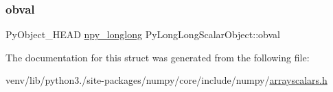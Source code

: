 \subsubsection{\texorpdfstring{obval}{obval}}
{\footnotesize\ttfamily Py\+Object\+\_\+\+H\+E\+AD \hyperlink{npy__common_8h_a76415457b972c826fabd23b1295a000b}{npy\+\_\+longlong} Py\+Long\+Long\+Scalar\+Object\+::obval}



The documentation for this struct was generated from the following file\+:\begin{DoxyCompactItemize}
\item 
venv/lib/python3./site-\/packages/numpy/core/include/numpy/\hyperlink{arrayscalars_8h}{arrayscalars.\+h}\end{DoxyCompactItemize}
